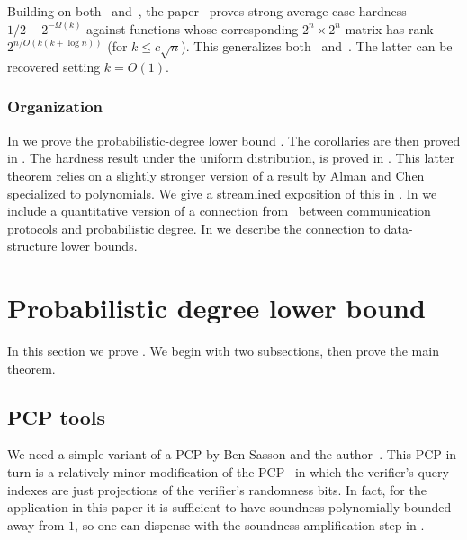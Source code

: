 \documentclass{toc}
\begin{document}
Building on both~\cite{ChenLW2020-almost} and~\cite{DBLP:journals/corr/abs-2005-03123},
the paper~\cite{Huang-Viola-average-case-rigidity} proves strong
average-case hardness $1/2-2^{-\Omega(k)}$ against functions whose
corresponding $2^{n}\times2^{n}$ matrix has rank $2^{n/O(k(k+\log n))}$
(for $k\le c\sqrt{n}$). This generalizes both~\cite{ChenLW2020-almost}
and~\cite{DBLP:journals/corr/abs-2005-03123}. The latter can be recovered
setting $k=O(1)$.

\subsubsection{Organization}

In  we prove the probabilistic-degree
lower bound . The corollaries
are then proved in . The hardness
result under the uniform distribution, 
is proved in . This
latter theorem relies on a slightly stronger version of a result by
Alman and Chen specialized to polynomials. We give a streamlined exposition
of this in . In  we include a quantitative version of
a connection from~\cite{Viola-map} between communication protocols
and probabilistic degree. In  we
describe the connection to data-structure lower bounds.

\section{Probabilistic degree lower bound \label{sec:Probabilistic-degree-lower}}

In this section we prove .
We begin with two subsections, then prove the main theorem.

\subsection{PCP tools \label{subsec:PCP-tools}}

We need a simple variant of a PCP by Ben-Sasson and the author~\cite{Ben-SassonV-AC0PCP}.
This PCP in turn is a relatively minor modification of the PCP~\cite{Ben-SassonGHSV05}
in which the verifier's query indexes are just projections of the
verifier's randomness bits. In fact, for the application in this paper
it is sufficient to have soundness polynomially bounded away from
$1$, so one can dispense with the soundness amplification step in
\cite{Ben-SassonV-AC0PCP}.
\end{document}

